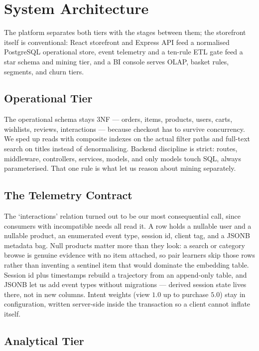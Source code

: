 \documentclass[conference]{IEEEtran}
\begin{document}
\section{System Architecture}
\label{sec:arch}

The platform separates both tiers with the stages between them; the storefront
itself is conventional: React storefront and Express API feed a normalised PostgreSQL
operational store, event telemetry and a ten-rule ETL gate feed a star schema and
mining tier, and a BI console serves OLAP, basket rules, segments, and churn tiers.

\subsection{Operational Tier}

The operational schema stays 3NF --- orders, items, products, users, carts,
wishlists, reviews, interactions --- because checkout has to survive concurrency.
We sped up reads with composite indexes on the actual filter paths and full-text
search on titles instead of denormalising. Backend discipline is strict: routes,
middleware, controllers, services, models, and only models touch SQL, always
parameterised. That one rule is what let us reason about mining separately.

\subsection{The Telemetry Contract}
\label{sec:telemetry}

The `interactions' relation turned out to be our most consequential call, since
consumers with incompatible needs all read it. A row holds a nullable user and a
nullable product, an enumerated event type, session id, client tag, and a JSONB
metadata bag. Null products matter more than they look: a search or category browse
is genuine evidence with no item attached, so pair learners skip those rows rather
than inventing a sentinel item that would dominate the embedding table. Session id
plus timestamps rebuild a trajectory from an append-only table, and JSONB let us
add event types without migrations --- derived session state lives there, not in
new columns. Intent weights (view $1.0$ up to purchase $5.0$) stay in configuration,
written server-side inside the transaction so a client cannot inflate itself.

\subsection{Analytical Tier}
\end{document}
